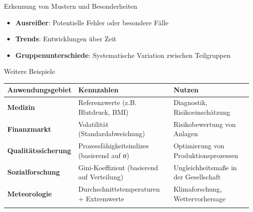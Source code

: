 \documentclass[
  ignorenonframetext,
]{beamer}
\newcounter{none} %
\providecommand{\tightlist}{%
  \setlength{\itemsep}{0pt}\setlength{\parskip}{0pt}}
\begin{document}
\begin{frame}{Erkennung von Mustern und Besonderheiten}
\protect{}\label{erkennung-von-mustern-und-besonderheiten}
\begin{itemize}
\tightlist
\item
  \textbf{Ausreißer}: Potentielle Fehler oder besondere Fälle
\item
  \textbf{Trends}: Entwicklungen über Zeit
\item
  \textbf{Gruppenunterschiede}: Systematische Variation zwischen
  Teilgruppen
\end{itemize}
\end{frame}

\begin{frame}{Weitere Beispiele}
\protect{}\label{weitere-beispiele}
{\def\LTcaptype{none} %
\begin{longtable}[]{@{}
  >{\raggedright\arraybackslash}p{}
  >{\raggedright\arraybackslash}p{}
  >{\raggedright\arraybackslash}p{}@{}}
\toprule\noalign{}
\begin{minipage}[b]{\linewidth}\raggedright
Anwendungsgebiet
\end{minipage} & \begin{minipage}[b]{\linewidth}\raggedright
Kennzahlen
\end{minipage} & \begin{minipage}[b]{\linewidth}\raggedright
Nutzen
\end{minipage} \\
\midrule\noalign{}
\endhead
\textbf{Medizin} & Referenzwerte (z.B. Blutdruck, BMI) & Diagnostik,
Risikoeinschätzung \\
\textbf{Finanzmarkt} & Volatilität (Standardabweichung) &
Risikobewertung von Anlagen \\
\textbf{Qualitätssicherung} & Prozessfähigkeitsindizes (basierend auf σ)
& Optimierung von Produktionsprozessen \\
\textbf{Sozialforschung} & Gini-Koeffizient (basierend auf Verteilung) &
Ungleichheitsmaße in der Gesellschaft \\
\textbf{Meteorologie} & Durchschnittstemperaturen + Extremwerte &
Klimaforschung, Wettervorhersage \\
\bottomrule\noalign{}
\end{longtable}
}
\end{frame}
\end{document}
